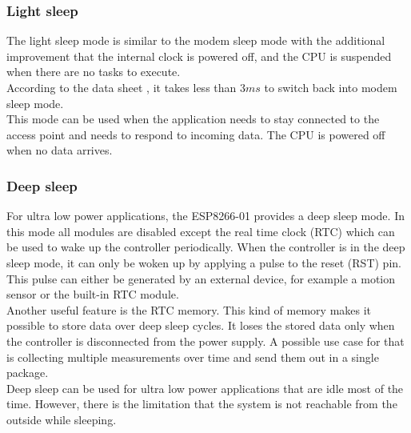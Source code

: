 \subsubsection{Light sleep} \label{sec:light_sleep}
The light sleep mode is similar to the modem sleep mode with the additional improvement that the internal clock is powered off, and the CPU is suspended when there are no tasks to execute.\\
According to the data sheet \cite{espressif_inc_esp8266_2016}, it takes less than $3ms$ to switch back into modem sleep mode.\\
This mode can be used when the application needs to stay connected to the access point 
and needs to respond to incoming data. The CPU is powered off when no data arrives.

\subsubsection{Deep sleep} \label{sec:deep_sleep}
For ultra low power applications, the ESP8266-01 provides a deep sleep mode.
In this mode all modules are disabled except the real time clock (RTC) which can be used to wake up the controller periodically.
When the controller is in the deep sleep mode, it can only be woken up by applying a pulse to the reset (RST) pin.
This pulse can either be generated by an external device, for example a motion sensor or the built-in RTC module.\\
Another useful feature is the RTC memory. This kind of memory makes it possible to store data over deep sleep cycles.
It loses the stored data only when the controller is disconnected from the power supply.
A possible use case for that is collecting multiple measurements over time and send them out in a single package.\\
Deep sleep can be used for ultra low power applications that are idle most of the time. 
However, there is the limitation that the system is not reachable from the outside while sleeping. \cite{espressif_inc_esp8266_2016}